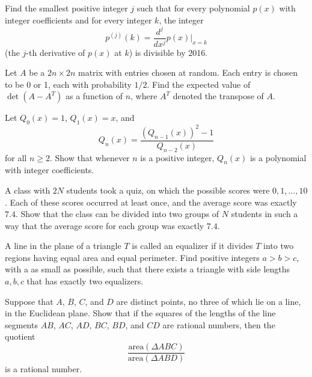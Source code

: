 \documentclass[12pt]{article}
\begin{document}
    \begin{exercise}[2016 A1]
        Find the smallest positive integer $j$ such that for every polynomial $p(x)$ with integer coefficients and for every integer $k$, the integer
        \[p^{(j)}(k) = \frac{d^j}{dx^j}p(x)\bigg|_{x=k}\] (the $j$-th derivative of $p(x)$ at $k$) is divisible by 2016.
    \end{exercise}

    \begin{exercise}[2016 B4]
        Let \(A\) be a \(2n\times 2n\) matrix with entries chosen at random.
        Each entry is chosen to be 0 or 1, each with probability \(1/2\).
        Find the expected value of \(\det(A-A^T)\) as a function of \(n\), where \(A^T\) denoted the transpose of \(A\).
    \end{exercise}

    \begin{exercise}[2017 A2]
        Let \(Q_0(x)=1\), \(Q_1(x)=x\), and
        \[Q_n(x)=\frac{(Q_{n-1}(x))^2-1}{Q_{n-2}(x)}\]
        for all \(n\geq 2\). Show that whenever \(n\) is a positive integer, \(Q_n(x)\) is a polynomial with integer coefficients.
    \end{exercise}

    \begin{exercise}[2017 A4]
        A class with $2N$ students took a quiz, on which the possible scores were $0, 1,\dots , 10$. Each of these scores occurred at least once, and the average score was exactly $7.4$. Show that the class can be divided into two groups of $N$ students in such a way that the average score for each group was exactly $7.4$. 
    \end{exercise}

    \begin{exercise}[2017 B5]
        A line in the plane of a triangle $T$ is called an equalizer if it divides $T$ into two regions having equal area and equal perimeter. Find positive integers $a > b > c$, with a as small as possible, such that there exists a triangle with side lengths $a, b, c$ that has exactly two equalizers.
    \end{exercise}
    
    \begin{exercise}[2018 A6]
        Suppose that $A$, $B$, $C$, and $D$ are distinct points, no three of which lie on a line, in the Euclidean plane. Show that if the squares of the lengths of the line segments $AB$, $AC$, $AD$, $BC$, $BD$, and $CD$ are rational numbers, then the quotient
        \[\frac{\textrm{area}(\Delta ABC)}{\textrm{area}(\Delta ABD)}\]
        is a rational number.
    \end{exercise}
\end{document}
